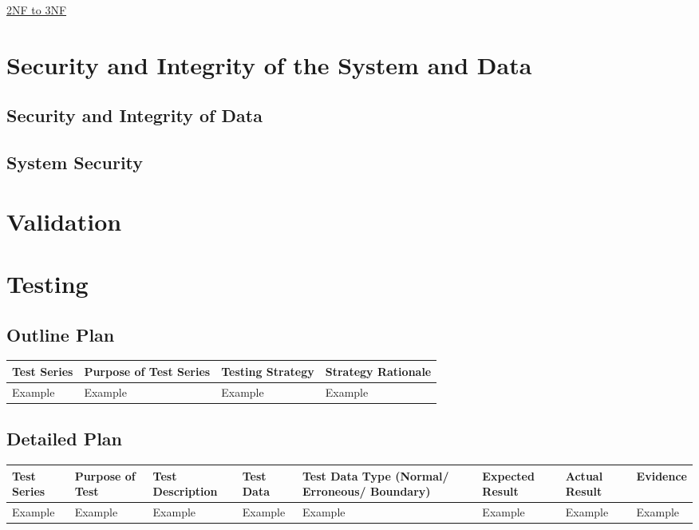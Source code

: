 \underline{2NF to 3NF}



\section{Security and Integrity of the System and Data}

\subsection{Security and Integrity of Data}

\subsection{System Security}

\section{Validation}

\section{Testing}

\begin{landscape}
\subsection{Outline Plan}

\begin{center}
    \begin{tabular}{|p{2cm}|p{5cm}|p{5cm}|p{4cm}|}
        \hline
        \textbf{Test Series} & \textbf{Purpose of Test Series} & \textbf{Testing Strategy} & \textbf{Strategy Rationale}\\ \hline
        Example & Example & Example & Example \\ \hline
    \end{tabular}
\end{center}

\subsection{Detailed Plan}

\begin{center}
    \begin{longtable}{|p{1.5cm}|p{2.5cm}|p{2.5cm}|p{2cm}|p{2cm}|p{2cm}|p{2cm}|p{2cm}|}
        \hline
        \textbf{Test Series} & \textbf{Purpose of Test} & \textbf{Test Description} & \textbf{Test Data} & \textbf{Test Data Type (Normal/ Erroneous/ Boundary)} & \textbf{Expected Result} & \textbf{Actual Result} & \textbf{Evidence}\\ \hline
        Example & Example & Example & Example & Example & Example & Example & Example \\ \hline
    \end{longtable}
\end{center}
\end{landscape}
